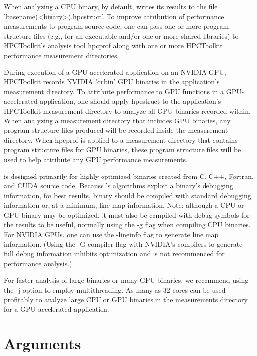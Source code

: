 \documentclass[english]{article}
\begin{document}
When analyzing a CPU binary, by default, 
 writes its results to the file 'basename(<binary>).hpcstruct'.
To improve attribution of performance measurements to program source code, one can
pass one or more program structure files (e.g., for an executable and/or 
one or more shared libraries) to HPCToolkit's analysis tool hpcprof
along with one or more HPCToolkit performance measurement directories.

During execution of a GPU-accelerated application on an NVIDIA GPU, HPCToolkit
records NVIDIA 'cubin' GPU binaries in the application's measurement directory.
To attribute performance to GPU functions in a GPU-accelerated application, one
should apply hpcstruct to the application's HPCToolkit measurement directory to
analyze all GPU binaries recorded within. When analyzing a measurement directory
that includes GPU binaries, any program structure files produced will be recorded
inside the measurement directory. When hpcprof is applied to a measurement
directory that contains program structure files for GPU binaries, these program
structure files will be used to help attribute any GPU performance measurements.

 is designed primarily for highly optimized binaries created from
C, C++, Fortran, and CUDA source code. Because 's algorithms exploit a
binary's debugging information, for best results, binary should be compiled
with standard debugging information or, at a minimum, line map information.
Note: although a CPU or GPU binary may be optimized, it must also be
compiled with debug symbols for the results to be useful, normally using the -g
flag when compiling CPU binaries. 
For NVIDIA GPUs, one can use the -lineinfo flag to generate
line map information. (Using the -G compiler flag with NVIDIA's 
compilers to generate full debug information
inhibits optimization and is not recommended for performance analysis.)

For faster analysis of large binaries or many GPU binaries, we recommend using
the -j option to employ multithreading. As many as 32 cores can be used profitably
to analyze large CPU or GPU binaries in the measurements directory for a
GPU-accelerated application.


\section{Arguments}
\end{document}
